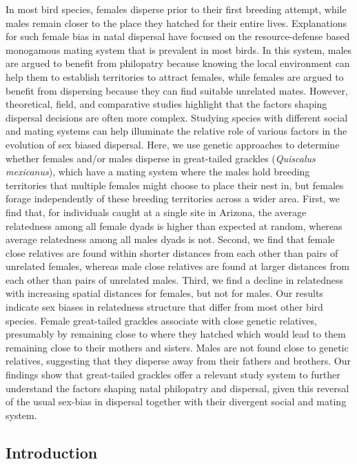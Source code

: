 \documentclass[]{article}
\begin{document}
In most bird species, females disperse prior to their first breeding
attempt, while males remain closer to the place they hatched for their
entire lives. Explanations for such female bias in natal dispersal have
focused on the resource-defense based monogamous mating system that is
prevalent in most birds. In this system, males are argued to benefit
from philopatry because knowing the local environment can help them to
establish territories to attract females, while females are argued to
benefit from dispersing because they can find suitable unrelated mates.
However, theoretical, field, and comparative studies highlight that the
factors shaping dispersal decisions are often more complex. Studying
species with different social and mating systems can help illuminate the
relative role of various factors in the evolution of sex biased
dispersal. Here, we use genetic approaches to determine whether females
and/or males disperse in great-tailed grackles (\emph{Quiscalus
mexicanus}), which have a mating system where the males hold breeding
territories that multiple females might choose to place their nest in,
but females forage independently of these breeding territories across a
wider area. First, we find that, for individuals caught at a single site
in Arizona, the average relatedness among all female dyads is higher
than expected at random, whereas average relatedness among all males
dyads is not. Second, we find that female close relatives are found
within shorter distances from each other than pairs of unrelated
females, whereas male close relatives are found at larger distances from
each other than pairs of unrelated males. Third, we find a decline in
relatedness with increasing spatial distances for females, but not for
males. Our results indicate sex biases in relatedness structure that
differ from most other bird species. Female great-tailed grackles
associate with close genetic relatives, presumably by remaining close to
where they hatched which would lead to them remaining close to their
mothers and sisters. Males are not found close to genetic relatives,
suggesting that they disperse away from their fathers and brothers. Our
findings show that great-tailed grackles offer a relevant study system
to further understand the factors shaping natal philopatry and
dispersal, given this reversal of the usual sex-bias in dispersal
together with their divergent social and mating system.

\newpage

\hypertarget{introduction}{%
\subsection{Introduction}\label{introduction}}
\end{document}
